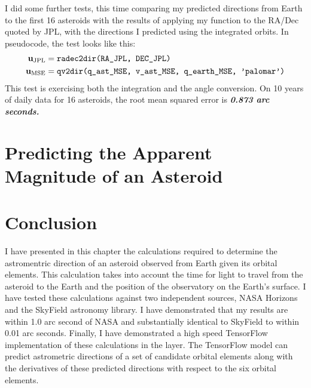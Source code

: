 I did some further tests, this time comparing my predicted directions from Earth to the first 16 asteroids 
with the results of applying my  function to the RA/Dec quoted by JPL,
with the directions I predicted using the integrated orbits.  In pseudocode, the test looks like this:
\begin{align*}
\mathbf{u}_{\mathrm{JPL}} &= \texttt{radec2dir(RA\_JPL, DEC\_JPL)} \\
\mathbf{u}_{\mathrm{MSE}} &= \texttt{qv2dir(q\_ast\_MSE, v\_ast\_MSE, q\_earth\_MSE, 'palomar')}
\end{align*}
This test is exercising both the integration and the angle conversion.
On 10 years of daily data for 16 asteroids, the root mean squared error is \textbf{\emph{0.873 arc seconds.}}

\section{Predicting the Apparent Magnitude of an Asteroid}
\label{section_mag}

\section{Conclusion}
\label{section_conclusion}
I have presented in this chapter the calculations required to determine the astromentric direction 
of an asteroid observed from Earth given its orbital elements.
This calculation takes into account the time for light to travel from the asteroid to the Earth
and the position of the observatory on the Earth's surface.
I have tested these calculations against two independent sources, NASA Horizons and the SkyField astronomy library.
I have demonstrated that my results are within 1.0 arc second of NASA and substantially identical to SkyField to within 0.01 arc seconds.
Finally, I have demonstrated a high speed TensorFlow implementation of these calculations in the  layer.
The TensorFlow model can predict astrometric directions of a set of candidate orbital elements 
along with the derivatives of these predicted directions with respect to the six orbital elements.
